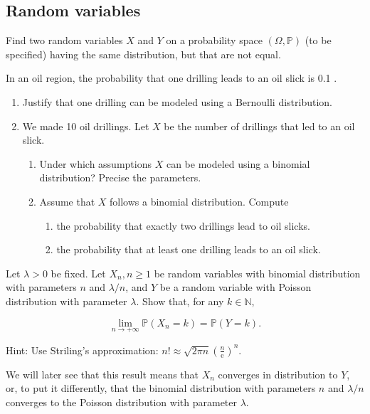\begin{center}
  \section*{Random variables}
\end{center}

\begin{Exercise}
  Find two random variables $X$ and $Y$ on a probability space $(\Omega, \mathbb{P})$ (to be specified) having the same distribution, but that are not equal.
\end{Exercise}

\begin{Exercise}
  In an oil region, the probability that one drilling leads to an oil slick is 0.1 .
  \begin{enumerate}
    \item Justify that one drilling can be modeled using a Bernoulli distribution.
    \item We made 10 oil drillings. Let $X$ be the number of drillings that led to an oil slick.
          \begin{enumerate}
            \item Under which assumptions $X$ can be modeled using a binomial distribution? Precise the parameters.
            \item Assume that $X$ follows a binomial distribution. Compute
                  \begin{enumerate}
                    \item the probability that exactly two drillings lead to oil slicks.
                    \item the probability that at least one drilling leads to an oil slick.
                  \end{enumerate}
          \end{enumerate}
  \end{enumerate}
\end{Exercise}

\begin{Exercise}
  Let $\lambda>0$ be fixed. Let $X_{n}, n \geq 1$ be random variables with binomial distribution with parameters $n$ and $\lambda / n$, and $Y$ be a random variable with Poisson distribution with parameter $\lambda$. Show that, for any $k \in \mathbb{N}$,

  $$
    \lim _{n \rightarrow+\infty} \mathbb{P}\left(X_{n}=k\right)=\mathbb{P}(Y=k) .
  $$

  Hint: Use Striling's approximation: $n ! \approx \sqrt{2 \pi n}\left(\frac{n}{\mathrm{e}}\right)^{n}$.

  We will later see that this result means that $X_{n}$ converges in distribution to $Y$, or, to put it differently, that the binomial distribution with parameters $n$ and $\lambda / n$ converges to the Poisson distribution with parameter $\lambda$.
\end{Exercise}
